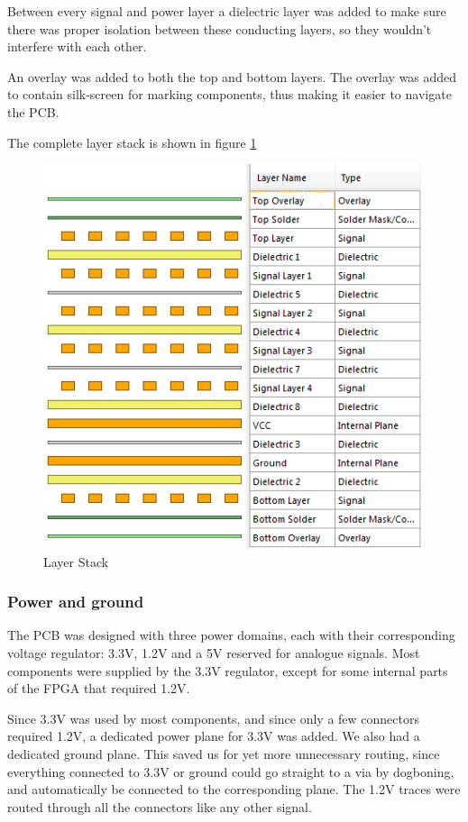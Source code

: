 Between every signal and power layer a dielectric layer was added to make sure there was proper isolation between these conducting layers, so they wouldn't interfere with each other.

An overlay was added to both the top and bottom layers.
The overlay was added to contain silk-screen for marking components, thus making it easier to navigate the PCB.

The complete layer stack is shown in figure \ref{fig:Layers}

\begin{figure}[h!]
\centering
\includegraphics[scale = 0.8]{images/Layers.png}
\caption{Layer Stack}
\label{fig:Layers}
\end{figure}

\subsubsection{Power and ground}
The PCB was designed with three power domains, each with their corresponding voltage regulator: 3.3V, 1.2V and a 5V reserved for analogue signals.
Most components were supplied by the 3.3V regulator, except for some internal parts of the FPGA that required 1.2V.

Since 3.3V was used by most components, and since only a few connectors required 1.2V, a dedicated power plane for 3.3V was added.
We also had a dedicated ground plane.
This saved us for yet more unnecessary routing, since everything connected to 3.3V or ground could go straight to a via by dogboning, and automatically be connected to the corresponding plane. The 1.2V traces were routed through all the connectors like any other signal. 

